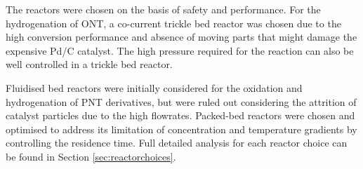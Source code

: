 The reactors were chosen on the basis of safety and performance. For the hydrogenation of ONT, a co-current trickle bed reactor was chosen due to the high conversion performance and absence of moving parts that might damage the expensive Pd/C catalyst. The high pressure required for the reaction can also be well controlled in a trickle bed reactor. 

Fluidised bed reactors were initially considered for the oxidation and hydrogenation of PNT derivatives, but were ruled out considering the attrition of catalyst particles due to the high flowrates. Packed-bed reactors were chosen and optimised to address its limitation of concentration and temperature gradients by controlling the residence time. Full detailed analysis for each reactor choice can be found in Section \ref{sec:reactorchoices}.